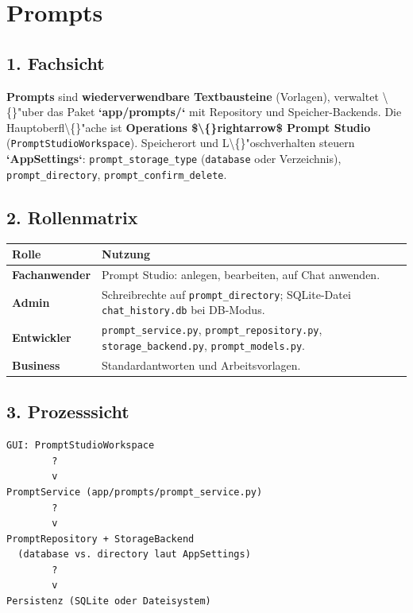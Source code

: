 \section{Prompts}

\subsection{1. Fachsicht}

\textbf{Prompts} sind \textbf{wiederverwendbare Textbausteine} (Vorlagen), verwaltet \textbackslash\{\}"uber das Paket \textbf{`app/prompts/`} mit Repository und Speicher-Backends. Die Hauptoberfl\textbackslash\{\}"ache ist \textbf{Operations \$\textbackslash\{\}rightarrow\$ Prompt Studio} (\texttt{PromptStudioWorkspace}). Speicherort und L\textbackslash\{\}"oschverhalten steuern \textbf{`AppSettings`}: \texttt{prompt\_storage\_type} (\texttt{database} oder Verzeichnis), \texttt{prompt\_directory}, \texttt{prompt\_confirm\_delete}.

\subsection{2. Rollenmatrix}

\begin{center}
\begin{tabular}{ll}
\hline
Rolle & Nutzung \\
\hline
\textbf{Fachanwender} & Prompt Studio: anlegen, bearbeiten, auf Chat anwenden. \\
\textbf{Admin} & Schreibrechte auf \texttt{prompt\_directory}; SQLite-Datei \texttt{chat\_history.db} bei DB-Modus. \\
\textbf{Entwickler} & \texttt{prompt\_service.py}, \texttt{prompt\_repository.py}, \texttt{storage\_backend.py}, \texttt{prompt\_models.py}. \\
\textbf{Business} & Standardantworten und Arbeitsvorlagen. \\
\hline
\end{tabular}
\end{center}

\subsection{3. Prozesssicht}

\begin{verbatim}
GUI: PromptStudioWorkspace
        ?
        v
PromptService (app/prompts/prompt_service.py)
        ?
        v
PromptRepository + StorageBackend
  (database vs. directory laut AppSettings)
        ?
        v
Persistenz (SQLite oder Dateisystem)
\end{verbatim}

